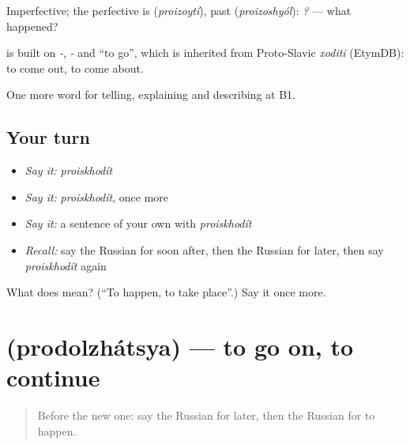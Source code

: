 Imperfective; the perfective is \emph{} (\emph{proizoytí}), past \emph{} (\emph{proizoshyól}): \emph{ ?} — what happened?

\begin{cousinweb}
\emph{} is built on \emph{-}, \emph{-} and \emph{} \textquotedblleft{}to go\textquotedblright{}, which is inherited from Proto-Slavic \emph{xoditi} (EtymDB): to come out, to come about.
\end{cousinweb}

\begin{grammarlens}[title={What you've built}]
One more word for telling, explaining and describing at B1.
\end{grammarlens}

\subsection*{Your turn}
\begin{itemize}
\raggedright
  \item \emph{Say it:} \emph{proiskhodít}
  \item \emph{Say it:} \emph{proiskhodít}, once more
  \item \emph{Say it:} a sentence of your own with \emph{proiskhodít}
  \item \emph{Recall:} say the Russian for soon after, then the Russian for later, then say \emph{proiskhodít} again
\end{itemize}

\begin{tcolorbox}[breakable,colback=teal!4,colframe=teal!35!black,title={Before you move on}]
What does  mean? (\textquotedblleft{}To happen, to take place\textquotedblright{}.) Say it once more.
\end{tcolorbox}
\section[\texorpdfstring{\ru{продолжаться} (prodolzhátsya)}{продолжаться (prodolzhátsya)}]{ (prodolzhátsya) — to go on, to continue}

\label{lesson:RU-C273-prodolzhatsya}



\begin{quote}
Before the new one: say the Russian for later, then the Russian for to happen.
\end{quote}

